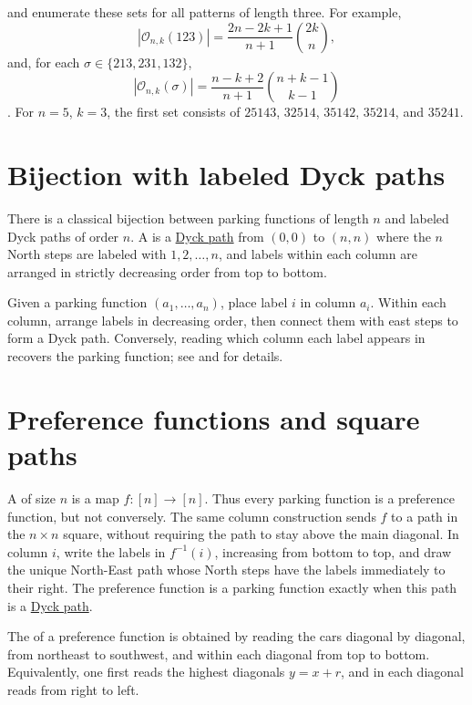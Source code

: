  and  enumerate these sets for
all patterns of length three. For example,
\[
 |\mathcal O_{n,k}(123)|=\frac{2n-2k+1}{n+1}\binom{2k}{n},
\]
and, for each $\sigma\in\{213,231,132\}$,
\[
 |\mathcal O_{n,k}(\sigma)|
   =\frac{n-k+2}{n+1}\binom{n+k-1}{k-1}
\]
\cite[Thms.~3.6, 3.17, 3.27 and 3.31]{FerreriMartinez2026x}.
For $n=5$, $k=3$, the first set consists of
$25143$, $32514$, $35142$, $35214$, and $35241$.

\section[parkingFunctionsLabeledDyck]{Bijection with labeled Dyck paths}

There is a classical bijection between parking functions of length $n$ and
labeled Dyck paths of order $n$.
A \label{labeledDyckPathDefinition} is a
\hyperref[qtCatalan]{Dyck path} from $(0,0)$ to $(n,n)$ where the $n$
North steps are labeled with $1,2,\dotsc,n$, and labels within each column
are arranged in strictly decreasing order from top to bottom.

Given a parking function $(a_1, \dotsc, a_n)$, place label $i$ in column $a_i$.
Within each column, arrange labels in decreasing order, then connect them with
east steps to form a Dyck path.
Conversely, reading which column each label appears in recovers the parking
function; see \cite{Yan2015} and \cite{qtCatalanBook} for details.

\section[preferenceFunctions]{Preference functions and square paths}

A \label{preferenceFunctionDefinition}
of size \(n\) is a map \(f:[n]\to[n]\).
Thus every parking function is a preference function, but not conversely.
The same column construction sends \(f\) to a path in the \(n\times n\)
square, without requiring the path to stay above the main diagonal.
In column \(i\), write the labels in \(f^{-1}(i)\), increasing from
bottom to top, and draw the unique North-East path whose North steps have
the labels immediately to their right.
The preference function is a parking function exactly when this path is a
\hyperref[qtCatalan]{Dyck path}.

The \label{preferenceFunctionReadingWord} of a
preference function is obtained by reading the cars diagonal by diagonal,
from northeast to southwest, and within each diagonal from top to bottom.
Equivalently, one first reads the highest diagonals \(y=x+r\), and in each
diagonal reads from right to left.

